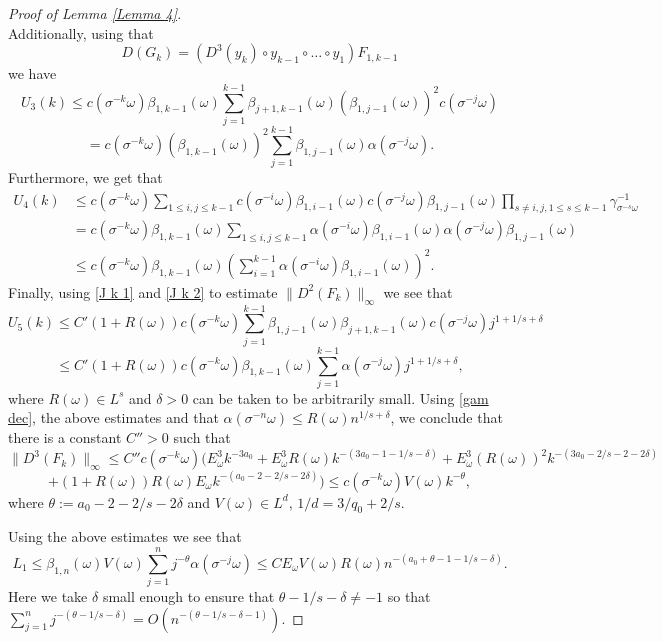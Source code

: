 \documentclass[10pt,a4paper]{amsart}
\def\om{\omega}
\begin{document}
\begin{proof}[Proof of Lemma \ref{Lemma 4}]
$$$$
Additionally, using that 
$$
D(G_k)= (D^3(y_k) \circ y_{k-1}\circ \ldots \circ y_1)F_{1,k-1}
$$
we have 
\begin{equation}\label{U3}
U_3(k)\leq c(\sigma^{-k}\om)\beta_{1,k-1}(\om)\sum_{j=1}^{k-1}\beta_{j+1,k-1}(\om)(\beta_{1,j-1}(\om))^2 c(\sigma^{-j}\om)
\end{equation}
$$
=c(\sigma^{-k}\om)(\beta_{1,k-1}(\om))^2\sum_{j=1}^{k-1}\beta_{1,j-1}(\om)\alpha(\sigma^{-j}\om).
$$
Furthermore, 
we get that
\begin{equation}\label{U4}
\begin{split}
U_4(k) &\leq c(\sigma^{-k}\om)\sum_{1\leq i,j\leq k-1}c(\sigma^{-i}\om)\beta_{1,i-1}(\om)c(\sigma^{-j}\om)\beta_{1,j-1}(\om)\prod_{s\not=i,j, 1\leq s\leq k-1}\gamma_{\sigma^{-s}\om}^{-1} \\
&=c(\sigma^{-k}\om)\beta_{1,k-1}(\om)\sum_{1\leq i,j\leq k-1}\alpha(\sigma^{-i}\om)\beta_{1,i-1}(\om)\alpha(\sigma^{-j}\om)\beta_{1,j-1}(\om) \\
&\leq c(\sigma^{-k}\om)\beta_{1,k-1}(\om)\left(\sum_{i=1}^{k-1}\alpha(\sigma^{-i}\om)\beta_{1,i-1}(\om)\right)^2.
\end{split}
\end{equation}
Finally, using \eqref{J k 1} and \eqref{J k 2} to estimate $\|D^2(F_k)\|_\infty$ we see that
\begin{equation}\label{U5}
U_5(k)\leq C'(1+R(\om))c(\sigma^{-k}\om)\sum_{j=1}^{k-1}\beta_{1,j-1}(\om)\beta_{j+1,k-1}(\om)c(\sigma^{-j}\om)j^{1+1/s+\delta}
\end{equation}
$$
 \leq C'(1+R(\om))c(\sigma^{-k}\om)\beta_{1,k-1}(\om)\sum_{j=1}^{k-1}\alpha(\sigma^{-j}\om)j^{1+1/s+\delta},
$$
where $R(\om)\in L^s$ and $\delta>0$ can be taken to be arbitrarily small.
Using \eqref{gam dec}, the above estimates and that $\alpha(\sigma^{-n}\om)\leq R(\om)n^{1/s+\delta}$, we conclude that  there is a constant $C''>0$ such that
$$
\|D^3(F_k)\|_\infty\leq C''c(\sigma^{-k}\om)\Big(E_\om^3 k^{-3a_0}+E_\om^3 R(\om) k^{-(3a_0-1-1/s-\delta)}+E_\om^3 (R(\om))^2 k^{-(3a_0-2/s-2-2\delta)}
$$
$$
+(1+R(\om))R(\om)E_\om k^{-(a_0-2-2/s-2\delta)} \Big)\leq c(\sigma^{-k}\om)V(\om)k^{-\theta},
$$
where $\theta :=a_0-2-2/s-2\delta$
and $V(\om)\in L^d$, $1/d=3/q_0+2/s$. 

Using the above estimates we see that 
\begin{equation*}
  L_1\leq \beta_{1,n}(\om)V(\om)\sum_{j=1}^n j^{-\theta}\alpha(\sigma^{-j}\om)\leq CE_\om V(\om)R(\om)n^{-(a_0+\theta-1-1/s-\delta)}.  
\end{equation*}
Here we take $\delta$ small enough to ensure that $\theta-1/s-\delta\not=-1$ so that 
$
\sum_{j=1}^n j^{-(\theta-1/s-\delta)}=O(n^{-(\theta-1/s-\delta-1)}).
$




\end{proof}
\end{document}
